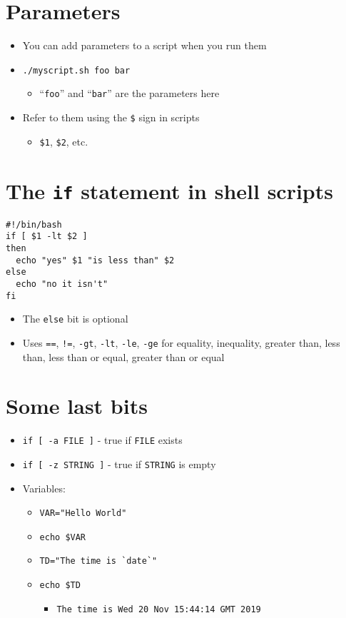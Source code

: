 \documentclass{article}
\begin{document}
\section{Parameters}
\begin{itemize}
\item You can add parameters to a script when you run them
\item \verb!./myscript.sh foo bar!
\begin{itemize}
\item ``\verb!foo!'' and ``\verb!bar!'' are the parameters here
\end{itemize}

\item Refer to them using the \verb!$! sign in scripts
\begin{itemize}
\item \verb!$1!, \verb!$2!, etc.
\end{itemize}
\end{itemize}



\section{The \texttt{if} statement in shell scripts}
\begin{verbatim}
#!/bin/bash
if [ $1 -lt $2 ] 
then
  echo "yes" $1 "is less than" $2
else 
  echo "no it isn't"
fi
\end{verbatim}
\begin{itemize}
\item The \verb!else! bit is optional
\item Uses \verb!==!, \verb~!=~, \verb!-gt!, \verb!-lt!, \verb!-le!, \verb!-ge! for equality, inequality, greater than, less than, less than or equal, greater than or equal
\end{itemize}



\section{Some last bits}
\begin{itemize}
\item \verb!if [ -a FILE ]! - true if \verb!FILE! exists
\item \verb!if [ -z STRING ]! - true if \verb!STRING! is empty
\item Variables:
\begin{itemize}
\item \verb!VAR="Hello World"!
\item \verb!echo $VAR!
\item \verb!TD="The time is `date`"!
\item \verb!echo $TD!
\begin{itemize}
\item \verb!The time is Wed 20 Nov 15:44:14 GMT 2019!
\end{itemize}
\end{itemize}
\end{itemize}
\end{document}
